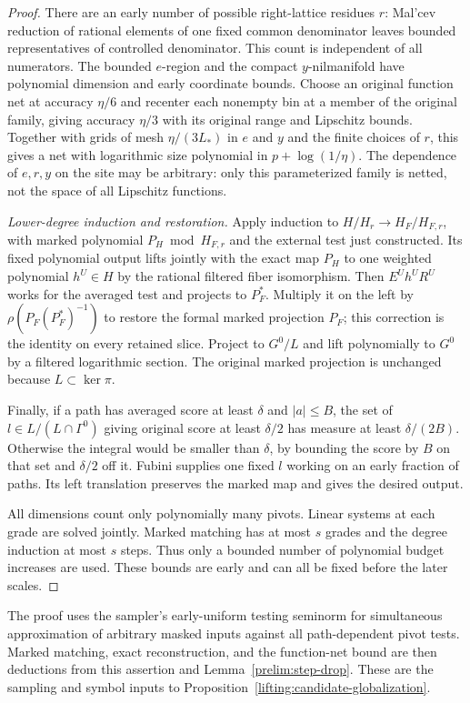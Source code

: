 \begin{proof}
There are an early number of possible right-lattice residues $r$:
Mal'cev reduction of rational elements of one fixed common
denominator leaves bounded representatives of controlled
denominator.  This count is independent of all numerators.  The
bounded $e$-region and the compact $y$-nilmanifold have polynomial
dimension and early coordinate bounds.  Choose an original function
net at accuracy $\eta/6$ and recenter each nonempty bin at a member
of the original family, giving accuracy $\eta/3$ with its original
range and Lipschitz bounds.  Together with grids of mesh
$\eta/(3L_*)$ in $e$ and $y$ and the finite choices of $r$, this
gives a net with
logarithmic size polynomial in $p+\log(1/\eta)$.  The dependence of
$e,r,y$ on the site may be arbitrary: only this parameterized family
is netted, not the space of all Lipschitz functions.

\emph{Lower-degree induction and restoration.}
Apply induction to $H/H_r\to H_F/H_{F,r}$, with marked polynomial
$P_H\bmod H_{F,r}$ and the external test just constructed.  Its
fixed polynomial output lifts jointly with the exact map $P_H$ to
one weighted polynomial $h^U\in H$ by the rational filtered fiber
isomorphism.  Then $E^Uh^UR^U$ works for the averaged test and
projects to $P_F^*$.  Multiply it on the left by
$\rho(P_F(P_F^*)^{-1})$ to restore the formal marked projection
$P_F$; this correction is the identity on every retained slice.
Project to $G^0/L$ and lift polynomially to $G^0$ by a filtered
logarithmic section.  The original marked projection is unchanged
because $L\subset\ker\pi$.

Finally, if a path has averaged score at least $\delta$ and
$|a|\le B$, the set of $l\in L/(L\cap\Gamma^0)$ giving original
score at least $\delta/2$ has measure at least $\delta/(2B)$.
Otherwise the integral would be smaller than $\delta$, by bounding
the score by $B$ on that set and $\delta/2$ off it.  Fubini supplies
one fixed $l$ working on an early fraction of paths.  Its left
translation preserves the marked map and gives the desired output.

All dimensions count only polynomially many pivots.  Linear systems
at each grade are solved jointly.  Marked matching has at most $s$
grades and the degree induction at most $s$ steps.  Thus only a
bounded number of polynomial budget increases are used.  These
bounds are early and can all be fixed before the later scales.
\end{proof}

\begin{remark}
\label{lifting:globalization-gap}
The proof uses the sampler's early-uniform testing seminorm for
simultaneous approximation of arbitrary masked inputs against all
path-dependent pivot tests.  Marked matching, exact reconstruction,
and the function-net bound are then deductions from this assertion
and Lemma~\ref{prelim:step-drop}.  These are the sampling and symbol
inputs to Proposition~\ref{lifting:candidate-globalization}.
\end{remark}

